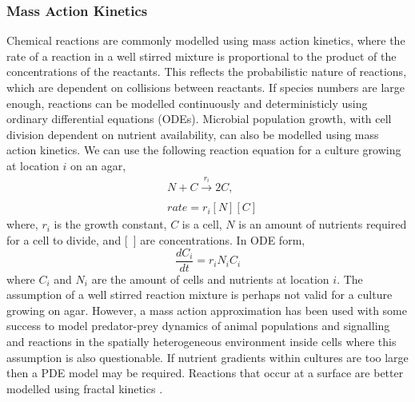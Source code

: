 \begin{multicols}{2}
\subsubsection{Mass Action Kinetics}
Chemical reactions are commonly modelled using mass action kinetics, where the rate of a
reaction in a well stirred mixture is proportional to the product of the concentrations of
the reactants. This reflects the probabilistic nature of reactions, which are dependent on
collisions between reactants. If species numbers are large enough, reactions can be
modelled continuously and deterministicly using ordinary differential equations
(ODEs). Microbial population growth, with cell division dependent on nutrient
availability, can also be modelled using mass action kinetics. We can use the following
reaction equation for a culture growing at location \(i\) on an agar,
\begin{subequations}
  \label{eq:9}
  \begin{align}
    &N + C \xrightarrow[]{r_{i}} 2C,\\
    &rate = r_{i}[N][C]
  \end{align}
\end{subequations}
where, \(r_{i}\) is the growth constant, \(C\) is a cell, \(N\) is an amount of nutrients
required for a cell to divide, and [~] are concentrations. In ODE form,
\begin{equation}
  \label{eq:10}
  \frac{dC_{i}}{dt} = r_{i}N_{i}C_{i}
\end{equation}
where \(C_{i}\) and \(N_{i}\) are the amount of cells and nutrients at location \(i\).
The assumption of a well stirred reaction mixture is perhaps not valid for a culture
growing on agar. However, a mass action approximation has been used with some success to
model predator-prey dynamics of animal populations \citep{Berryman1992} and signalling and
reactions in the spatially heterogeneous environment inside cells
\citep{Aldridge2006,Chen2010} where this assumption is also questionable. If nutrient
gradients within cultures are too large then a PDE model may be required. Reactions that
occur at a surface are better modelled using fractal kinetics \citep{savageau1995}.

\end{multicols}
